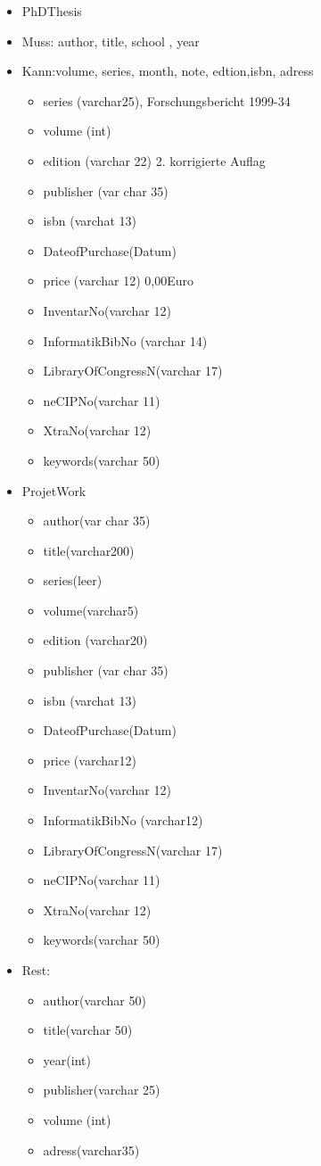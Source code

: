 \documentclass{article}
\begin{document}
\begin{itemize}
 \item PhDThesis
 \item Muss: author, title, school , year      
 \item Kann:volume, series, month, note, edtion,isbn, adress 
 
 \begin{itemize}
  \item series (varchar25),                 Forschungsbericht 1999-34
\item		volume (int)
\item		edition (varchar 22)			2. korrigierte Auflag
\item		publisher (var char 35)
\item		isbn (varchat 13)
\item		DateofPurchase(Datum)
\item		price (varchar 12)			0,00Euro
\item		InventarNo(varchar 12)
\item		InformatikBibNo (varchar 14) 
\item		LibraryOfCongressN(varchar 17)
\item		neCIPNo(varchar 11)
\item		XtraNo(varchar 12)
\item		keywords(varchar 50)
\end{itemize}
\end{itemize}



\begin{itemize}
 \item ProjetWork
 
 
 \begin{itemize}
\item author(var char 35)
\item		title(varchar200)
\item		series(leer)
\item		volume(varchar5)
\item		edition (varchar20)
\item		publisher (var char 35)
\item		isbn (varchat 13)
\item		DateofPurchase(Datum)
\item		price (varchar12)		
\item		InventarNo(varchar 12)
\item		InformatikBibNo (varchar12) 
\item		LibraryOfCongressN(varchar 17)
\item		neCIPNo(varchar 11)
\item		XtraNo(varchar 12)
\item		keywords(varchar 50)
\end{itemize}
\end{itemize}

\begin {itemize}
\item Rest:
\begin{itemize}
\item		author(varchar 50)
\item		title(varchar 50)
\item		year(int)
\item		publisher(varchar 25)
\item		volume (int)
\item		adress(varchar35)	
\end{itemize}
\end{itemize}
\end{document}
